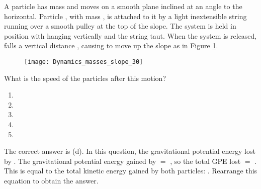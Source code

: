 
\begin{problem} 
{A particle  has mass  and moves on a smooth plane inclined at an angle  to the horizontal. Particle , with mass , is attached to it by a light inextensible string running over a smooth pulley at the top of the slope. The system is held in position with  hanging vertically and the string taut. When the system is released,  falls a vertical distance , causing  to move up the slope as in Figure \ref{fig:Dynamics_masses_slope_30}.
\begin{figure}[h]
	\centering
	\texttt{[image: Dynamics\_masses\_slope\_30]}
	\caption{}
	\label{fig:Dynamics_masses_slope_30}
\end{figure}
\nl
What is the speed of the particles after this motion?
\begin{enumerate}
	\item {}
	\item {}
	\item {}
	\item {} \answer
	\item {}
\end{enumerate}
}
{}
{The correct answer is (d). In this question, the gravitational potential energy lost by . The gravitational potential energy gained by  $=$ , so the total GPE lost $=$ . This is equal to the total kinetic energy gained by both particles: . Rearrange this equation to obtain the answer.
}
\end{problem}